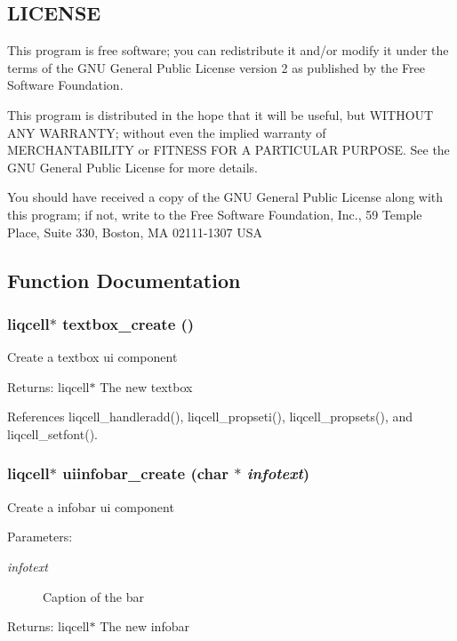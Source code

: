 \subsection{LICENSE}\label{de/d77/liqui_8c_LICENSE}
This program is free software; you can redistribute it and/or modify it under the terms of the GNU General Public License version 2 as published by the Free Software Foundation.

This program is distributed in the hope that it will be useful, but WITHOUT ANY WARRANTY; without even the implied warranty of MERCHANTABILITY or FITNESS FOR A PARTICULAR PURPOSE. See the GNU General Public License for more details.

You should have received a copy of the GNU General Public License along with this program; if not, write to the Free Software Foundation, Inc., 59 Temple Place, Suite 330, Boston, MA 02111-1307 USA 

\subsection{Function Documentation}
\subsubsection[{textbox\_\-create}]{\setlength{\rightskip}{0pt plus 5cm}liqcell$\ast$ textbox\_\-create ()}\label{de/d77/liqui_8c_b76604624d41e70f6ab2153a1095761e}


Create a textbox ui component \begin{Desc}
\item[Returns:]liqcell$\ast$ The new textbox \end{Desc}


References liqcell\_\-handleradd(), liqcell\_\-propseti(), liqcell\_\-propsets(), and liqcell\_\-setfont().
\subsubsection[{uiinfobar\_\-create}]{\setlength{\rightskip}{0pt plus 5cm}liqcell$\ast$ uiinfobar\_\-create (char $\ast$ {\em infotext})}\label{de/d77/liqui_8c_026054236250e13055d9b18bdaa96ed3}


Create a infobar ui component \begin{Desc}
\item[Parameters:]
\begin{description}
\item[{\em infotext}]Caption of the bar \end{description}
\end{Desc}
\begin{Desc}
\item[Returns:]liqcell$\ast$ The new infobar \end{Desc}


